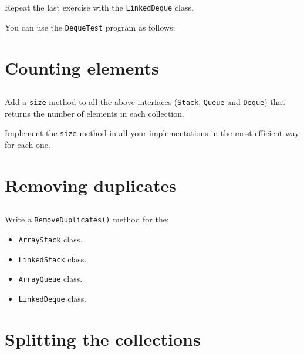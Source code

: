 \documentclass[a4paper, 11pt]{article}
\begin{document}
Repeat the last exercise with the \texttt{LinkedDeque} class.

You can use the \texttt{DequeTest} program as follows:





\section{Counting elements}

\subsection{}

Add a \texttt{size} method to all the above interfaces (\texttt{Stack},
\texttt{Queue} and \texttt{Deque}) that returns the number of elements in each
collection.

Implement the \texttt{size} method in all your implementations in the most
efficient way for each one.





\section{Removing duplicates}

\subsection{}

Write a \texttt{RemoveDuplicates()} method for the:

\begin{itemize}

  \item \texttt{ArrayStack} class.
  \item \texttt{LinkedStack} class.
  \item \texttt{ArrayQueue} class.
  \item \texttt{LinkedDeque} class.

\end{itemize}





\section{Splitting the collections}
\end{document}
